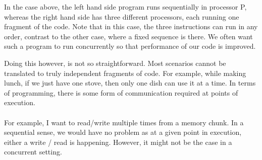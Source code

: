     In the case above, the left hand side program runs sequentially in processor P, whereas the right hand side has three different processors, each running one fragment of the code. Note that in this case, the three instructions can run in any order, contrast to the other case, where a fixed sequence is there. We often want such a program to run concurrently so that performance of our code is improved. 
    \newline
    
    Doing this however, is not so straightforward. Most scenarios cannot be translated to truly independent fragments of code. For example, while making lunch, if we just have one stove, then only one dish can use it at a time. In terms of programming, there is some form of communication required at points of execution. 
    \paragraph{}
    For example, I want to read/write multiple times from a memory chunk. In a sequential sense, we would have no problem as at a given point in execution, either a write / read is happening. However, it might not be the case in a concurrent setting. 
    
    \begin{center}
    \end{center}
    
